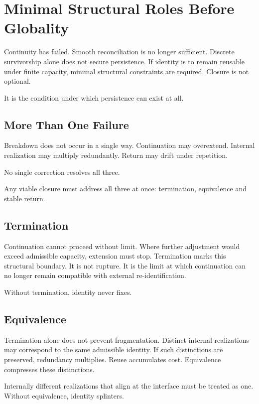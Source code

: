 \documentclass[11pt,twoside,openright]{book}
\begin{document}
\chapter{Minimal Structural Roles Before Globality}

Continuity has failed. Smooth reconciliation is no longer sufficient. Discrete survivorship alone does not secure persistence. If identity is to remain reusable under finite capacity, minimal structural constraints are required. Closure is not optional.

It is the condition under which persistence can exist at all.

\section*{More Than One Failure}

Breakdown does not occur in a single way. Continuation may overextend. Internal realization may multiply redundantly. Return may drift under repetition.

No single correction resolves all three.

Any viable closure must address all three at once: termination, equivalence and stable return.

\section*{Termination}

Continuation cannot proceed without limit. Where further adjustment would exceed admissible capacity, extension must stop. Termination marks this structural boundary. It is not rupture. It is the limit at which continuation can no longer remain compatible with external re-identification.

Without termination, identity never fixes.

\section*{Equivalence}

Termination alone does not prevent fragmentation. Distinct internal realizations may correspond to the same admissible identity. If such distinctions are preserved, redundancy multiplies. Reuse accumulates cost. Equivalence compresses these distinctions.

Internally different realizations that align at the interface must be treated as one. Without equivalence, identity splinters.
\end{document}
